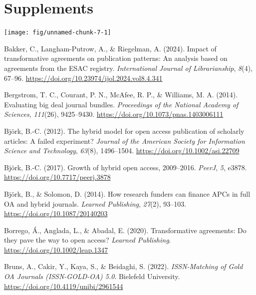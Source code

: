 \documentclass[a4paper,man,floatsintext,longtable,noextraspace,12pt]{apa6}
\newenvironment{CSLReferences}%
  {}%
  {\par}
\begin{document}
\hypertarget{supplements}{%
\section{Supplements}\label{supplements}}

\begin{center}\texttt{[image: fig/unnamed-chunk-7-1]} \end{center}

\hypertarget{refs}{}
\begin{CSLReferences}{1}{0}
\leavevmode{}%
Bakker, C., Langham-Putrow, A., \& Riegelman, A. (2024). Impact of
transformative agreements on publication patterns: An analysis based on
agreements from the ESAC registry. \emph{International Journal of
Librarianship}, \emph{8}(4), 67--96.
\url{https://doi.org/10.23974/ijol.2024.vol8.4.341}

\leavevmode{}%
Bergstrom, T. C., Courant, P. N., McAfee, R. P., \& Williams, M. A.
(2014). Evaluating big deal journal bundles. \emph{Proceedings of the
National Academy of Sciences}, \emph{111}(26), 9425--9430.
\url{https://doi.org/10.1073/pnas.1403006111}

\leavevmode{}%
Björk, B.-C. (2012). The hybrid model for open access publication of
scholarly articles: A failed experiment? \emph{Journal of the American
Society for Information Science and Technology}, \emph{63}(8),
1496--1504. \url{https://doi.org/10.1002/asi.22709}

\leavevmode{}%
Björk, B.-C. (2017). Growth of hybrid open access, 2009--2016.
\emph{PeerJ}, \emph{5}, e3878. \url{https://doi.org/10.7717/peerj.3878}

\leavevmode{}%
Björk, B., \& Solomon, D. (2014). How research funders can finance APCs
in full OA and hybrid journals. \emph{Learned Publishing}, \emph{27}(2),
93--103. \url{https://doi.org/10.1087/20140203}

\leavevmode{}%
Borrego, Á., Anglada, L., \& Abadal, E. (2020). Transformative
agreements: Do they pave the way to open access? \emph{Learned
Publishing}. \url{https://doi.org/10.1002/leap.1347}

\leavevmode{}%
Bruns, A., Cakir, Y., Kaya, S., \& Beidaghi, S. (2022).
\emph{{ISSN-Matching of Gold OA Journals (ISSN-GOLD-OA) 5.0}}. Bielefeld
University. \url{https://doi.org/10.4119/unibi/2961544}


\end{CSLReferences}
\end{document}
